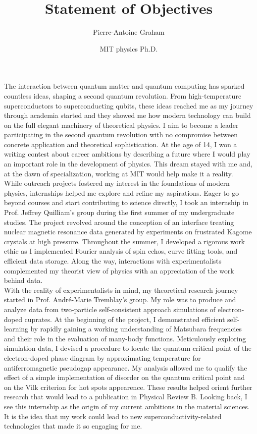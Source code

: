 \documentclass[12pt]{article}
\title{Statement of Objectives}
\author{Pierre-Antoine Graham}
\date{MIT physics Ph.D.}
\begin{document}
\maketitle
\vspace{0.5cm}

The interaction between quantum matter and quantum computing has sparked countless ideas, shaping a second quantum revolution. From high-temperature superconductors to superconducting qubits, these ideas reached me as my journey through academia started and they showed me how modern technology can build on the full elegant machinery of theoretical physics. I aim to become a leader participating in the second quantum revolution with no compromise between concrete application and theoretical sophistication. At the age of 14, I won a writing contest about career ambitions by describing a future where I would play an important role in the development of physics. This dream stayed with me and, at the dawn of specialization, working at MIT would help make it a reality.\\[0.2cm]

While outreach projects fostered my interest in the foundations of modern physics, internships helped me explore and refine my aspirations. Eager to go beyond courses and start contributing to science directly, I took an internship in Prof. Jeffrey Quilliam's group during the first summer of my undergraduate studies. The project revolved around the conception of an interface treating nuclear magnetic resonance data generated by experiments on frustrated Kagome crystals at high pressure. Throughout the summer, I developed a rigorous work ethic as I implemented Fourier analysis of spin echos, curve fitting tools, and efficient data storage. Along the way, interactions with experimentalists complemented my theorist view of physics with an appreciation of the work behind data.\\[0.2cm]

With the reality of experimentalists in mind, my theoretical research journey started in Prof. André-Marie Tremblay's group. My role was to produce and analyze data from two-particle self-consistent approach simulations of electron-doped cuprates. At the beginning of the project, I demonstrated efficient self-learning by rapidly gaining a working understanding of Matsubara frequencies and their role in the evaluation of many-body functions. Meticulously exploring simulation data, I devised a procedure to locate the quantum critical point of the electron-doped phase diagram by approximating temperature for antiferromagnetic pseudogap appearance. My analysis allowed me to qualify the effect of a simple implementation of disorder on the quantum critical point and on the Vilk criterion for hot spots appearence. These results helped orient further research that would lead to a publication in Physical Review B. Looking back, I see this internship as the origin of my current ambitions in the material sciences. It is the idea that my work could lead to new superconductivity-related technologies that made it so engaging for me.\\[0.2cm] 
\end{document}
